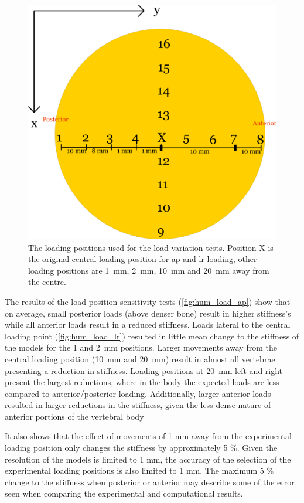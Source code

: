 \begin{figure}[ht!]
\centering
\includegraphics[width=.7\textwidth]{Chapters/Chapter_HT_images/Loading_positions_Human.png}
\caption{The loading positions used for the load variation tests. Position X is
the original central loading position for ap and lr loading, other loading
positions are 1~mm, 2~mm, 10~mm and 20~mm away from the centre.}
\label{fig:loading_pos}
\end{figure}


The results of the load position sensitivity tests (\cref{fig:hum_load_ap})
show that on average, small posterior loads (above denser bone) result in
higher stiffness's while all anterior loads result in a reduced stiffness.
Loads lateral to the central loading point (\cref{fig:hum_load_lr}) resulted in
little mean change to the stiffness of the models for the 1 and 2~mm
positions.
Larger movements away from the central loading position (10~mm and 20~mm)
result in almost all vertebrae presenting a reduction in stiffness.
Loading positions at 20~mm left and right present the largest reductions, where
in the body the expected loads are less compared to anterior/posterior
loading.
Additionally, larger anterior loads resulted in larger reductions in the
stiffness, given the less dense nature of anterior portions of the vertebral
body

It also shows that the effect of movements of 1 mm away from the experimental
loading position only changes the stiffness by approximately 5 \%.
Given the resolution of the models is limited to 1 mm, the accuracy of the
selection of the experimental loading positions is also limited to 1 mm.
The maximum 5 \% change to the stiffness when posterior or anterior may
describe some of the error seen when comparing the experimental and
computational results.

